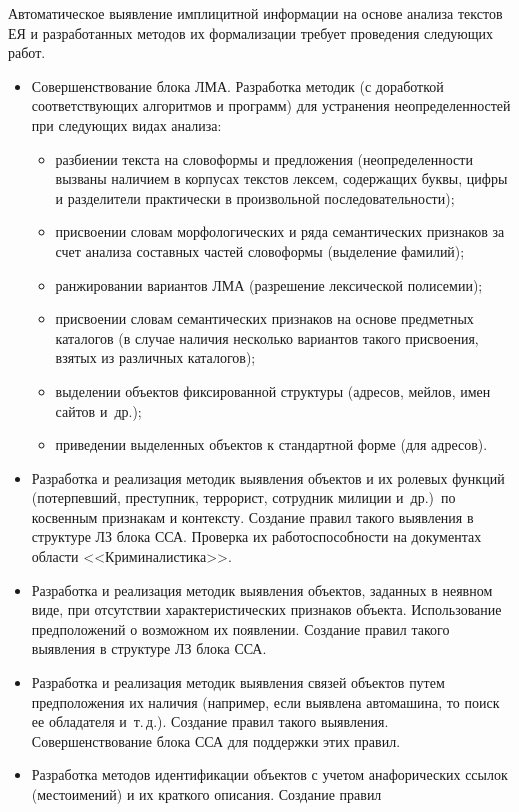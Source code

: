 \begin{multicols}{2}
     Автоматическое выявление имплицитной информации на основе анализа 
текстов ЕЯ и разработанных методов их формализации требует проведения 
следующих работ.
     \begin{itemize}
\item  Совершенствование блока ЛМА. 
Разработка методик (с доработкой соответствующих алгоритмов и программ) 
для устранения неопределенностей при следующих видах анализа:
\begin{itemize}
\item разбиении текста на словоформы и предложения (неопределенности 
вызваны наличием в корпусах текстов лексем, содержащих буквы, цифры и 
разделители практически в произвольной последовательности); 
\item присвоении словам морфологических и ряда семантических 
признаков за счет анализа составных частей словоформы (выделение фамилий); 
\item ранжировании вариантов ЛМА (разрешение лексической полисемии);
\item присвоении словам семантических признаков на основе предметных 
каталогов (в случае наличия несколько вариантов такого присвоения, взятых из 
различных каталогов);
\item выделении объектов фиксированной структуры (адресов, мейлов, 
имен сайтов и~др.);
\item приведении выделенных объектов к стандартной форме (для адресов).
\end{itemize}
\item  Разработка и реализация методик выявления объектов и их ролевых 
функций (потерпевший, преступник, террорист, сотрудник милиции и~др.)\ по 
косвенным признакам и контексту. Создание правил такого выявления в 
структуре ЛЗ блока  ССА. Проверка их 
работоспособности на документах области <<Криминалистика>>. 
\item Разработка и реализация методик выявления объектов, заданных в 
неявном виде, при отсутствии характеристических признаков объекта. 
Использование предположений о возможном их появлении. Создание правил 
такого выявления в структуре ЛЗ блока  ССА. 
\item Разработка и реализация методик выявления связей объектов путем 
предположения их наличия (например, если выявлена автомашина, то поиск ее 
обладателя и~т.\,д.). Создание правил такого выявления. Совершенствование 
блока ССА для поддержки этих  правил. 
\item Разработка методов идентификации объектов с учетом анафорических 
ссылок (местоимений) и их краткого описания. Создание правил 

\end{itemize}
\end{multicols}
